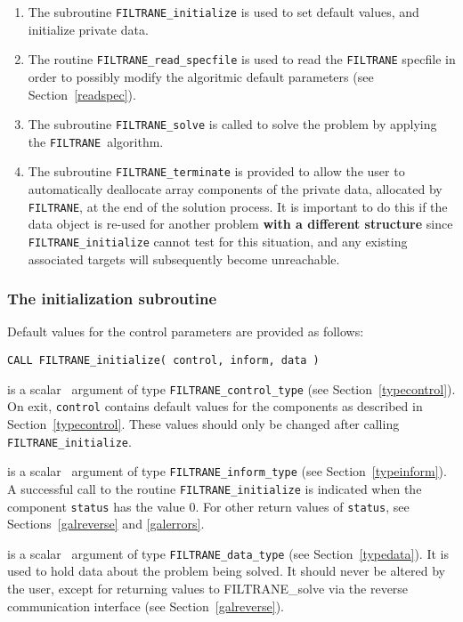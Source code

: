 \documentclass{galahad}
\newcommand{\packagename}{FILTRANE}
\newcommand{\filtrane}{{\tt \packagename}}
\begin{document}
\begin{enumerate}
\item The subroutine {\tt \packagename\_initialize}
      is used to set default values, and initialize private data.
\item The routine {\tt \packagename\_read\_specfile}
      is used to read the {\tt \packagename} specfile in order to
      possibly modify the algoritmic default parameters (see
      Section~\ref{readspec}).
\item The subroutine {\tt \packagename\_solve}
      is called to solve the problem by applying the \filtrane\ algorithm.
\item The subroutine {\tt \packagename\_terminate}
      is provided to allow the user to automatically deallocate array
      components of the private data, allocated by
      {\tt \packagename}, at the end of the solution process.
      It is important to do this if the data object is re-used for another
      problem {\bf with a different structure}
      since {\tt \packagename\_initialize} cannot test for this situation,
      and any existing associated targets will subsequently become unreachable.
\end{enumerate}


\subsubsection{The initialization subroutine}\label{subinit}

Default values for the control parameters are provided as follows:
\vspace*{1mm}

\hspace{8mm}
{\tt CALL \packagename\_initialize( control, inform, data )}

\begin{description}
 is a scalar \intentout\ argument of type
{\tt \packagename\_control\_type}
(see Section~\ref{typecontrol}).
On exit, {\tt control} contains default values for the components as
described in Section~\ref{typecontrol}.
These values should only be changed after calling
{\tt \packagename\_initialize}.

 is a scalar \intentout\ argument of type
{\tt \packagename\_inform\_type} (see Section~\ref{typeinform}).
A successful call to the routine {\tt \packagename\_initialize}
is indicated when the  component {\tt status} has the value 0.
For other return values of {\tt status}, see Sections~\ref{galreverse} and
\ref{galerrors}.

 is a scalar \intentout\ argument of type
{\tt \packagename\_data\_type}
(see Section~\ref{typedata}). It is used to hold data about the problem being
solved. It should never be altered by the user, except for returning values to
\packagename\_solve via the reverse communication interface (see
Section~\ref{galreverse}).
\end{description}
\end{document}
